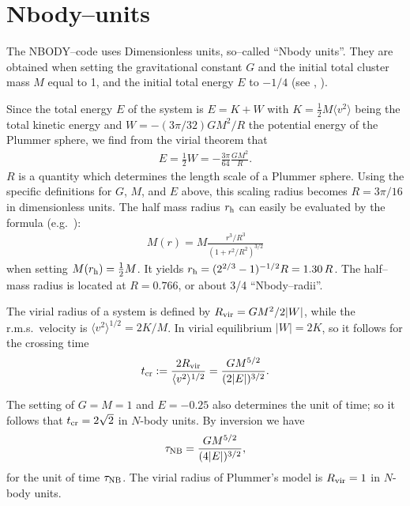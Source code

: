 
\section{Nbody--units}   \label{ch:nbtime}

The NBODY--code uses Dimensionless units, so--called
``Nbody units''.
They are obtained when setting the gravitational
constant $G$ and the initial total cluster mass $M$
equal to 1, and the initial total energy $E$ to $-1/4$
(see \cite{hm_86}, \cite{ahw_74}).

Since the total energy $E$ of the system is $E = K + W$
with $K = \frac{1}{2}M\langle v^2\rangle$ being
the total kinetic energy and $W = -(3\pi/32)GM^2/R$
the potential energy of the Plummer sphere, we
find from the virial theorem that
%
\begin{eqnarray}
   E = \frac{1}{2}W = -\frac{3\pi}{64}\frac{GM^2}{R}.
           \label{eq:totenergy}
\end{eqnarray}
%
$R$ is a quantity which determines the length scale of
a Plummer sphere.
Using the specific definitions for $G$, $M$, and $E$ above,
this scaling radius becomes $R = 3\pi/16$ in dimensionless
units.
The half mass radius $r_{\rm h}$ can easily be evaluated
by the formula (e.g.\ \cite{s_87}):
%
\begin{eqnarray}
   M(r) = M\frac{r^3/R^3}{(1+r^2/R^2)^{3/2}}
\end{eqnarray}
%
when setting $M(r_{\rm h}) = \frac{1}{2}M$.
It yields $r_{\rm h} = (2^{2/3}-1)^{-1/2}R = 1.30\, R$.
The half--mass radius is located at $R = 0.766$,
or about 3/4 ``Nbody--radii''.

The virial radius of a system is defined by
$R_{\rm vir} = GM^2/2\vert W \vert $, while the
r.m.s.\ velocity is $\langle v^2\rangle^{1/2} = 2K/M$.
In virial equilibrium $\vert W\vert = 2K$, so it follows
for the crossing time
%
\begin{eqnarray}
  t_{\rm cr} := {2 R_{\rm vir} \over \langle v^2\rangle^{1/2} }
      = \frac{ GM^{5/2} }{ (2\vert E\vert )^{3/2} }.
\end{eqnarray}

The setting of $G=M=1$ and $E=-0.25$ also determines the
unit of time;
so it follows that $t_{\rm cr} = 2\sqrt{2}$ in $N$-body units.
By inversion we have
\begin{eqnarray}
  \tau_{\rm NB} = \frac{ GM^{5/2} }{ (4\vert E\vert )^{3/2} }, \label{eq:tnb}
\end{eqnarray}
for the unit of time $\tau_{\rm NB}$.
The virial radius of Plummer's model is $R_{\rm vir} = 1$ in
$N$-body units.


